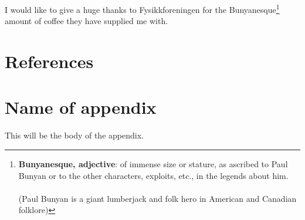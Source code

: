 \documentclass[reprint,english,notitlepage,nofootinbib]{revtex4-1}  %
\numberwithin{equation}{section}
\begin{document}
\begin{acknowledgments}  %
I would like to give a huge thanks to Fysikkforeningen for the
Bunyanesque\footnote{\textbf{Bunyanesque, adjective}: of immense size or stature, as ascribed to Paul Bunyan or to the other characters, exploits, etc., in the legends about him. \\ \\
(Paul Bunyan is a giant lumberjack and folk hero in American and Canadian folklore) } amount of coffee they have supplied me with.
\end{acknowledgments}


\section*{References}  %
\newpage
\appendix
\section{Name of appendix}
This will be the body of the appendix.



\end{document}
